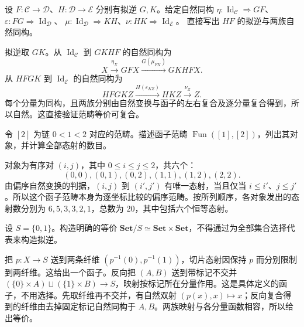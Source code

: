 \begin{exercise}\label{b4:ex:01-composite-equivalence}
	设 \(F:\mathcal C\rightarrow\mathcal D\)、\(H:\mathcal D\rightarrow\mathcal E\) 分别有拟逆 \(G,K\)。给定自然同构 \(\eta:\operatorname{Id}_{\mathcal C}\Rightarrow GF\)、\(\varepsilon:FG\Rightarrow\operatorname{Id}_{\mathcal D}\)、 \(\mu:\operatorname{Id}_{\mathcal D}\Rightarrow KH\)、\(\nu:HK\Rightarrow\operatorname{Id}_{\mathcal E}\)。 直接写出 \(HF\) 的拟逆与两族自然同构。
\end{exercise}
\begin{solution}
	拟逆取 \(GK\)。从 \(\operatorname{Id}_{\mathcal C}\) 到 \(GKHF\) 的自然同构为
	\[
		X\xrightarrow{\eta_X}GFX \xrightarrow{G(\mu_{FX})}GKHFX.
	\]
	从 \(HFGK\) 到 \(\operatorname{Id}_{\mathcal E}\) 的自然同构为
	\[
		HFGKZ\xrightarrow{H(\varepsilon_{KZ})}HKZ \xrightarrow{\nu_Z}Z.
	\]
	每个分量为同构，且两族分别由自然变换与函子的左右复合及逐分量复合得到，所以自然。这直接验证范畴等价可复合。
\end{solution}

\begin{exercise}\label{b4:ex:01-arrow-poset-count}
	令 \([2]\) 为链 \(0<1<2\) 对应的范畴。描述函子范畴 \(\operatorname{Fun}([1],[2])\)，列出其对象，并计算全部态射的数目。
\end{exercise}
\begin{solution}
	对象为有序对 \((i,j)\)，其中 \(0\le i\le j\le2\)，共六个：
	\[
		(0,0),(0,1),(0,2),(1,1),(1,2),(2,2).
	\]
	由偏序自然变换的判据，\((i,j)\) 到 \((i',j')\) 有唯一态射，当且仅当 \(i\le i'\)、\(j\le j'\)。所以这个函子范畴本身为逐坐标比较的偏序范畴。按所列顺序，各对象发出的态射数分别为 \(6,5,3,3,2,1\)，总数为 \(20\)，其中包括六个恒等态射。
\end{solution}

\begin{exercise}\label{b4:ex:01-slice-two-points}
	设 \(S=\{0,1\}\)。构造明确的等价 \(\mathbf{Set}/S\simeq\mathbf{Set}\times\mathbf{Set}\)，不得通过为全部集合选择代表来构造拟逆。
\end{exercise}
\begin{solution}
	把 \(p:X\rightarrow S\) 送到两条纤维 \((p^{-1}(0),p^{-1}(1))\)，切片态射因保持 \(p\) 而分别限制到两纤维。这给出一个函子。反向把 \((A,B)\) 送到带标记不交并 \((\{0\}\times A)\sqcup(\{1\}\times B)\rightarrow S\)，映射按标记所在分量作用。这是具体定义的函子，不用选择。先取纤维再不交并，有自然双射 \((p(x),x)\mapsto x\)；反向复合得到的纤维由去掉固定标记自然同构于 \(A,B\)。两族映射与各分量函数相容，所以给出等价。
\end{solution}

